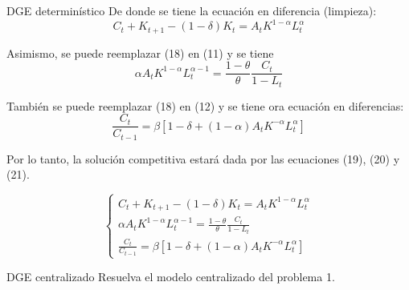 \documentclass[letterpaper, 11pt]{extarticle}
\begin{document}
\begin{problem}{DGE determinístico}{}
De donde se tiene la ecuación en diferencia (limpieza):
\begin{equation}
    C_t+K_{t+1}-(1-\delta)K_t=A_tK^{1-\alpha}L_t^{\alpha}
\end{equation}

Asimismo, se puede reemplazar (18) en (11) y se tiene
\begin{equation}
    \alpha A_tK^{1-\alpha}L_t^{\alpha-1}=\dfrac{1-\theta}{\theta}\dfrac{C_t}{1-L_t}
\end{equation}

También se puede reemplazar (18) en (12) y se tiene ora ecuación en diferencias:
\begin{equation}
    \dfrac{C_t}{C_{t-1}}=\beta[1-\delta+(1-\alpha)A_tK^{-\alpha}L_t^{\alpha}]
\end{equation}


Por lo tanto, la solución competitiva estará dada por las ecuaciones (19), (20) y (21).

\begin{equation}
\left\{
\begin{array}{l}
    C_t + K_{t+1} - (1-\delta)K_t = A_t K^{1-\alpha} L_t^{\alpha} \\
    \alpha A_t K^{1-\alpha} L_t^{\alpha-1} = \frac{1-\theta}{\theta} \frac{C_t}{1-L_t} \\
    \frac{C_t}{C_{t-1}} = \beta \left[1 - \delta + (1 - \alpha) A_t K^{-\alpha} L_t^{\alpha} \right]
\end{array}
\right.
\end{equation}


\end{problem}


\begin{problem}{DGE centralizado}{}
Resuelva el modelo centralizado del problema 1.

\end{problem}
\end{document}
